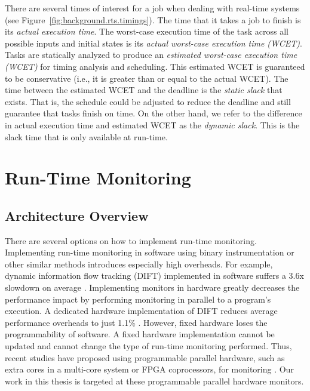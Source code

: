 There are several times of interest for a job when dealing with real-time
systems (see Figure~\ref{fig:background.rts.timings}). The time that it takes a
job to finish is its \emph{actual execution time}. The worst-case execution
time of the task across all possible inputs and initial states is its
\emph{actual worst-case execution time (WCET)}. Tasks are statically analyzed
to produce an \emph{estimated worst-case execution time (WCET)} for timing
analysis and scheduling. This estimated WCET is guaranteed to be conservative
(i.e., it is greater than or equal to the actual WCET).  The time between the
estimated WCET and the deadline is the \emph{static slack} that exists. That
is, the schedule could be adjusted to reduce the deadline and still guarantee
that tasks finish on time. On the other hand, we refer to the difference in
actual execution time and estimated WCET as the \emph{dynamic slack}. This is
the slack time that is only available at run-time.

\section{Run-Time Monitoring}
\label{sec:background.monitoring}

\subsection{Architecture Overview}

There are several options on how to implement run-time monitoring.
Implementing run-time monitoring in software using binary instrumentation or
other similar methods introduces especially high overheads. For example,
dynamic information flow tracking (DIFT) implemented in software suffers a 3.6x
slowdown on average \cite{qin06-lift}. Implementing monitors in hardware
greatly decreases the performance impact by performing monitoring in parallel
to a program's execution. A dedicated hardware implementation of DIFT reduces
average performance overheads to just 1.1\% \cite{suh-dift-asplos04}.  However,
fixed hardware loses the programmability of software. A fixed hardware
implementation cannot be updated and cannot change the type of run-time
monitoring performed. Thus, recent studies have proposed using programmable
parallel hardware, such as extra cores in a multi-core system or FPGA
coprocessors, for monitoring \cite{chen08-lba, flexcore-micro10,
harmoni-dsn12}. Our work in this thesis is targeted at these programmable
parallel hardware monitors.

